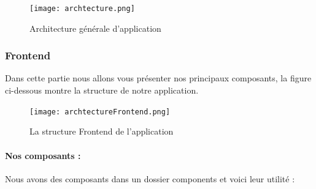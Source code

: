 \documentclass[12pt]{article}
\begin{document}
\begin{figure}[H]
    \centering
    \texttt{[image: archtecture.png]}
    \caption{Architecture générale d'application}
    \label{fig:archiApplication}
\end{figure}


\subsubsection{Frontend}
Dans cette partie nous allons vous présenter nos principaux composants, la figure ci-dessous montre la structure de notre application.
\begin{figure}[H]
    \centering
    \texttt{[image: archtectureFrontend.png]}
    \caption{ La structure Frontend de l'application}
    \label{fig:my_label}
\end{figure}
\paragraph{Nos composants : }
Nous avons des composants dans un dossier components et voici leur utilité :
\end{document}

